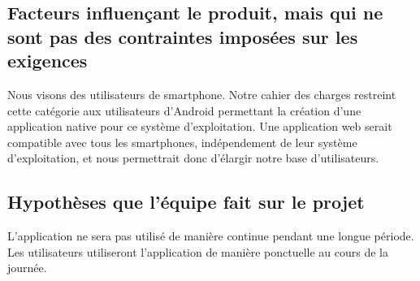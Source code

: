 \subsection{Facteurs influençant le produit, mais qui ne sont pas des contraintes imposées sur les exigences} %
\label{sub:facteurs_influen_ant_le_produit_mais_qui_ne_sont_pas_des_contraintes_impos_es_sur_les_exigences}

	Nous visons des utilisateurs de smartphone. Notre cahier des charges restreint cette catégorie aux utilisateurs d'Android permettant la création d'une application native pour ce système d'exploitation. Une application web serait compatible avec tous les smartphones, indépendement de leur système d'exploitation, et nous permettrait donc d'élargir notre base d'utilisateurs.


\subsection{Hypothèses que l’équipe fait sur le projet} %
\label{sub:hypoth_ses_que_l_quipe_fait_sur_le_projet}

	L'application ne sera pas utilisé de manière continue pendant une longue période. Les utilisateurs utiliseront l'application de manière ponctuelle au cours de la journée.

